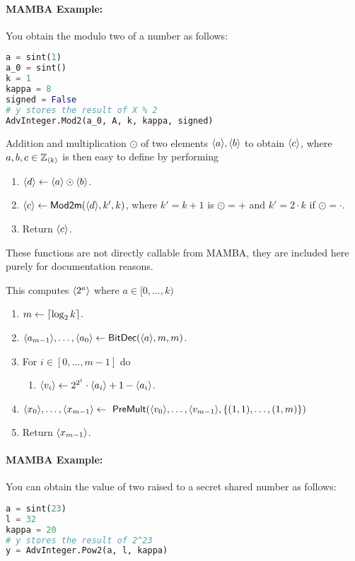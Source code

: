   \paragraph{MAMBA Example:} You obtain the modulo two of a number as follows:
  \begin{lstlisting}[language={python}]
a = sint(1)
a_0 = sint()
k = 1
kappa = 8
signed = False
# y stores the result of X % 2
AdvInteger.Mod2(a_0, A, k, kappa, signed)
\end{lstlisting}

  Addition and multiplication $\odot$ of two elements $\langle a \rangle, \langle b \rangle$
  to obtain $\langle c \rangle$, where $a,b,c \in {\mathbb{Z}}_{\langle k \rangle}$ is then easy to define
  by performing
  \begin{enumerate}
    \item $\langle d \rangle \leftarrow \langle a \rangle \odot \langle b \rangle$.
    \item $\langle c \rangle \leftarrow \mathsf{Mod2m}(\langle d \rangle,k',k)$,
          where $k'=k+1$ is $\odot=+$ and $k'=2\cdot k$ if $\odot=\cdot$.
    \item Return $\langle c \rangle$.
  \end{enumerate}
  These functions are not directly callable from MAMBA, they are
  included here purely for documentation reasons.

  This computes $\langle 2^a \rangle$ where $a \in [0,\ldots,k)$
  \begin{enumerate}
    \item $m \leftarrow {\lceil \log_2 k \rceil}$.
    \item $\langle a_{m-1} \rangle,\ldots,\langle a_0 \rangle \leftarrow \mathsf{BitDec}(\langle a \rangle,m,m)$.
    \item For $i\in [0,\ldots,m-1]$ do
          \begin{enumerate}
            \item $\langle v_i \rangle \leftarrow 2^{2^i} \cdot \langle a_i \rangle+1-\langle a_i \rangle$.
          \end{enumerate}
    \item $\sshare{x_0},\ldots,\sshare{x_{m-1}}
            \asn \ \mathsf{PreMult}(\sshare{v_0},\ldots,\sshare{v_{m-1}}, \{(1,1),\ldots,(1,m)\})$
    \item Return $\langle x_{m-1} \rangle$.
  \end{enumerate}
  \paragraph{MAMBA Example:} You can obtain the value of two raised to a secret shared number as follows:
  \begin{lstlisting}[language={python}]
a = sint(23)
l = 32
kappa = 20
# y stores the result of 2^23
y = AdvInteger.Pow2(a, l, kappa)
\end{lstlisting}

